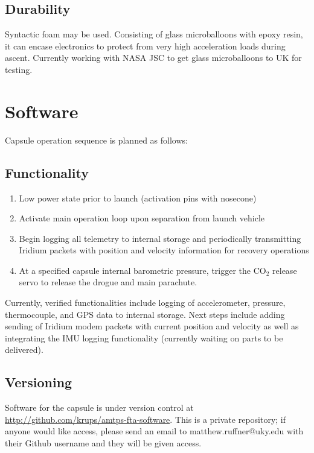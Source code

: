 \documentclass{article}
\begin{document}
\subsection{Durability}
Syntactic foam may be used. Consisting of glass microballoons with epoxy resin, it can encase electronics to protect from very high acceleration loads during ascent. Currently working with NASA JSC to get glass microballoons to UK for testing. 




\section{Software}
\label{sec:software}

Capsule operation sequence is planned as follows:

\subsection{Functionality}

\begin{enumerate}
	\item Low power state prior to launch (activation pins with nosecone)
	\item Activate main operation loop upon separation from launch vehicle
	\item Begin logging all telemetry to internal storage and periodically transmitting Iridium packets with position and velocity information for recovery operations
	\item At a specified capsule internal barometric pressure, trigger the CO$_2$ release servo to release the drogue and main parachute.
\end{enumerate}

Currently, verified functionalities include logging of accelerometer, pressure, thermocouple, and GPS data to internal storage. Next steps include adding sending of Iridium modem packets with current position and velocity as well as integrating the IMU logging functionality (currently waiting on parts to be delivered).

\subsection{Versioning}

Software for the capsule is under version control at \url{http://github.com/krups/amtps-fta-software}. This is a private repository; if anyone would like access, please send an email to matthew.ruffner@uky.edu with their Github username and they will be given access.
\end{document}
